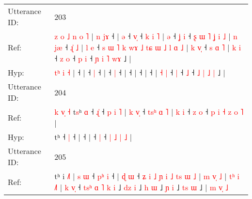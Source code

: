 \documentclass[10pt]{article}
\DeclareRobustCommand{\hl}[1]{{\textcolor{red}{#1}}}
\begin{document}
\begin{longtable}{ll}
 \\
\midrule
Utterance ID: & 203 \\
Ref: & \hl{z}\hl{ }\hl{o}\hl{ }\hl{˩}\hl{ }\hl{n} \hl{o} \hl{˥} |\hl{ }\hl{n}\hl{ }\hl{j}\hl{ɤ} ˧ |\hl{ }\hl{ə} ˧ \hl{v}\hl{̩} ˧\hl{ }\hl{k}\hl{ }\hl{i}\hl{ }\hl{˥} |\hl{ }\hl{ə} ˧\hl{ }\hl{ʝ} \hl{i} ˧\hl{ }\hl{ʂ}\hl{ }\hl{ɯ}\hl{ }\hl{˥}\hl{ }\hl{ʝ}\hl{ }\hl{i}\hl{ }\hl{˩} |\hl{ }\hl{n}\hl{ }\hl{j}\hl{æ} ˧\hl{ }\hl{ɻ}\hl{̍}\hl{ }\hl{˩} |\hl{ }\hl{l}\hl{ }\hl{e} ˧\hl{ }\hl{s}\hl{ }\hl{ɯ}\hl{ }\hl{˥}\hl{ }\hl{k}\hl{ }\hl{w}\hl{ɤ}\hl{ }\hl{˩}\hl{ }\hl{t}\hl{ɕ}\hl{ }\hl{ɯ}\hl{ }\hl{˩}\hl{ }\hl{l}\hl{ }\hl{ɑ}\hl{ }\hl{˩} |\hl{ }\hl{k}\hl{ }\hl{v}\hl{̩} ˧\hl{ }\hl{s}\hl{ }\hl{ɑ}\hl{ }\hl{˥} | \hl{k} \hl{i} ˧\hl{ }\hl{z} \hl{o} ˧\hl{ }\hl{p} \hl{i} ˧ \hl{ɲ} \hl{i} \hl{˥} \hl{w}\hl{ɤ} ˩ |
 \\
Hyp: & \hl{}\hl{}\hl{}\hl{}\hl{}\hl{t}\hl{ʰ} \hl{i} \hl{˧} |\hl{}\hl{}\hl{}\hl{}\hl{} ˧ |\hl{}\hl{} ˧ \hl{}\hl{|} ˧\hl{}\hl{}\hl{}\hl{}\hl{}\hl{} |\hl{}\hl{} ˧\hl{}\hl{} \hl{|} ˧\hl{}\hl{}\hl{}\hl{}\hl{}\hl{}\hl{}\hl{}\hl{}\hl{}\hl{}\hl{} |\hl{}\hl{}\hl{}\hl{}\hl{} ˧\hl{}\hl{}\hl{}\hl{}\hl{} |\hl{}\hl{}\hl{}\hl{} ˧\hl{}\hl{}\hl{}\hl{}\hl{}\hl{}\hl{}\hl{}\hl{}\hl{}\hl{}\hl{}\hl{}\hl{}\hl{}\hl{}\hl{}\hl{}\hl{}\hl{}\hl{}\hl{}\hl{}\hl{}\hl{}\hl{} |\hl{}\hl{}\hl{}\hl{}\hl{} ˧\hl{}\hl{}\hl{}\hl{}\hl{}\hl{} | \hl{˧} \hl{|} ˧\hl{}\hl{} \hl{|} ˧\hl{}\hl{} \hl{˩} ˧ \hl{˩} \hl{|} \hl{˩} \hl{}\hl{|} ˩ |
 \\
\midrule
Utterance ID: & 204 \\
Ref: & \hl{k}\hl{ }\hl{v}\hl{̩}\hl{ }\hl{˧}\hl{ }t\hl{s}ʰ\hl{ }\hl{ɑ} ˧ \hl{ɻ}\hl{̍} ˧\hl{ }\hl{p}\hl{ }\hl{i}\hl{ }\hl{˥} |\hl{ }\hl{k}\hl{ }\hl{v}\hl{̩} ˧\hl{ }\hl{t}\hl{s}\hl{ʰ}\hl{ }\hl{ɑ}\hl{ }\hl{˥} |\hl{ }\hl{k}\hl{ }\hl{i} ˧\hl{ }\hl{z} \hl{o} ˧\hl{ }\hl{p}\hl{ }\hl{i} \hl{˧} \hl{z} \hl{o} \hl{˥} |
 \\
Hyp: & \hl{}\hl{}\hl{}\hl{}\hl{}\hl{}\hl{}t\hl{}ʰ\hl{}\hl{} ˧ \hl{}\hl{|} ˧\hl{}\hl{}\hl{}\hl{}\hl{}\hl{} |\hl{}\hl{}\hl{}\hl{}\hl{} ˧\hl{}\hl{}\hl{}\hl{}\hl{}\hl{}\hl{}\hl{} |\hl{}\hl{}\hl{}\hl{} ˧\hl{}\hl{} \hl{|} ˧\hl{}\hl{}\hl{}\hl{} \hl{|} \hl{˩} \hl{|} \hl{˩} |
 \\
\midrule
Utterance ID: & 205 \\
Ref: & tʰ i \hl{˩}\hl{˥} |\hl{ }\hl{s}\hl{ }\hl{ɯ} ˧\hl{ }\hl{p}\hl{ʰ} \hl{i} ˧ |\hl{ }\hl{ɖ}\hl{ }\hl{ɯ} ˧\hl{ }\hl{ʑ}\hl{ }\hl{i}\hl{ }\hl{˩}\hl{ }\hl{ɲ}\hl{ }\hl{i}\hl{ }\hl{˩}\hl{ }\hl{t}\hl{s}\hl{ }\hl{ɯ}\hl{ }\hl{˩} |\hl{ }\hl{m}\hl{ }\hl{v}\hl{̩} \hl{˩} |\hl{ }\hl{t}\hl{ʰ}\hl{ }\hl{i} \hl{˩}\hl{˥} |\hl{ }\hl{k}\hl{ }\hl{v}\hl{̩} ˧\hl{ }\hl{t}\hl{s}\hl{ʰ}\hl{ }\hl{ɑ}\hl{ }\hl{˥}\hl{ }\hl{k}\hl{ }\hl{i} ˩\hl{ }\hl{d}\hl{z} \hl{i} ˩\hl{ }\hl{h} \hl{ɯ} ˩\hl{ }\hl{ɲ} \hl{i} ˩\hl{ }\hl{t}\hl{s} \hl{ɯ} ˩ |\hl{ }\hl{m}\hl{ }\hl{v}\hl{̩}\hl{ }\hl{˩}

\end{longtable}
\end{document}
